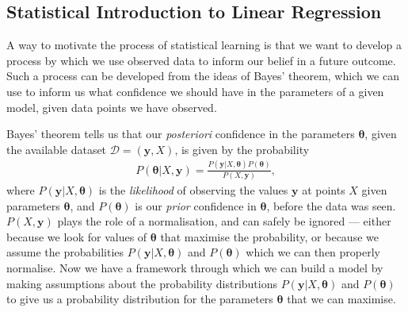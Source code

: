 \documentclass[twocolumn,english,notitlepage]{article}
\renewcommand{\vec}[1]{\boldsymbol{#1}}
\begin{document}
        


    \subsection{Statistical Introduction to Linear Regression}
        A way to motivate the process of statistical learning is that we want to develop a process by which we use observed data to inform our belief in a future outcome. Such a process can be developed from the ideas of Bayes' theorem, which we can use to inform us what confidence we should have in the parameters of a given model, given data points we have observed.
        
        Bayes' theorem tells us that our \textit{posteriori} confidence in the parameters $\vec{\theta}$, given the available dataset $\mathcal{D}=(\vec{y}, X)$, is given by the probability
        \begin{align}
            P(\vec{\theta}|X, \vec{y}) = \frac{P(\vec{y}|X,\vec{\vec{\theta}})P(\vec{\theta})}{P(X,\vec{y})},
        \end{align}
        where $P(\vec{y}|X, \vec{\theta})$ is the \textit{likelihood} of observing the values $\vec{y}$ at points $X$ given parameters $\vec{\theta}$, and $P(\vec{\theta})$ is our \textit{prior} confidence in $\vec{\theta}$, before the data was seen. $P(X,\vec{y})$ plays the role of a normalisation, and can safely be ignored --- either because we look for values of $\vec{\theta}$ that maximise the probability, or because we assume the probabilities $P(\vec{y}|X,\vec{\theta})$ and $P(\vec{\theta})$ which we can then properly normalise. Now we have a framework through which we can build a model by making assumptions about the probability distributions $P(\vec{y}|X,\vec{\theta})$ and $P(\vec{\theta})$ to give us a probability distribution for the parameters $\vec{\theta}$ that we can maximise.
\end{document}
